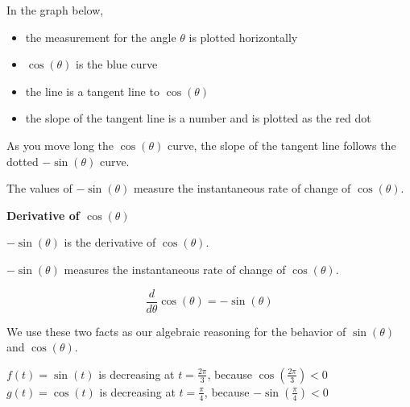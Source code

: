 \documentclass{ximera}
\begin{document}
In the graph below, 

\begin{itemize}
\item the measurement for the angle $\theta$ is plotted horizontally
\item $\cos(\theta)$ is the blue curve
\item the line is a tangent line to $\cos(\theta)$
\item the slope of the tangent line is a number and is plotted as the red dot
\end{itemize}

As you move long the $\cos(\theta)$ curve, the slope of the tangent line follows the dotted $-\sin(\theta)$ curve.



\begin{center}
\end{center}



The values of $-\sin(\theta)$ measure the instantaneous rate of change of $\cos(\theta)$.



\begin{theorem}  \textbf{\textcolor{green!50!black}{Derivative of $\cos(\theta)$}}

\begin{center}
$-\sin(\theta)$ is the derivative of $\cos(\theta)$. 

$-\sin(\theta)$ measures the instantaneous rate of change of $\cos(\theta)$. 
\end{center}


\[
\frac{d}{d\theta} \cos(\theta) = -\sin(\theta)
\]


\end{theorem}







We use these two facts as our algebraic reasoning for the behavior of $\sin(\theta)$ and $\cos(\theta)$.




\begin{example}



$f(t) = \sin(t)$ is decreasing at $t=\frac{2\pi}{3}$, because $\cos\left( \frac{2\pi}{3} \right) < 0$ \\


$g(t) = \cos(t)$ is decreasing at $t=\frac{\pi}{4}$, because $-\sin\left( \frac{\pi}{4} \right) < 0$

\end{example}
\end{document}
